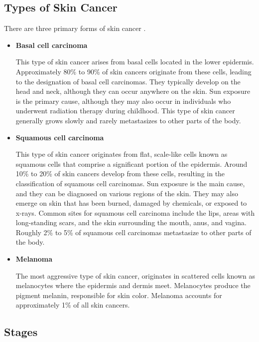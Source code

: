\subsection{Types of Skin Cancer}

There are three primary forms of skin cancer \cite{BaseCancerKnowledge}.

\begin{itemize}

  \item \textbf{Basal cell carcinoma}

    This type of skin cancer arises from basal cells located in the lower
    epidermis. Approximately 80\% to 90\% of skin cancers originate from
    these cells, leading to the designation of basal cell carcinomas. They
    typically develop on the head and neck, although they can occur anywhere
    on the skin. Sun exposure is the primary cause, although they may also
    occur in individuals who underwent radiation therapy during childhood.
    This type of skin cancer generally grows slowly and rarely metastasizes
    to other parts of the body.

  \item \textbf{Squamous cell carcinoma}

    This type of skin cancer originates from flat, scale-like cells known as
    squamous cells that comprise a significant portion of the epidermis.
    Around 10\% to 20\% of skin cancers develop from these cells, resulting
    in the classification of squamous cell carcinomas. Sun exposure is the
    main cause, and they can be diagnosed on various regions of the skin.
    They may also emerge on skin that has been burned, damaged by chemicals,
    or exposed to x-rays. Common sites for squamous cell carcinoma include
    the lips, areas with long-standing scars, and the skin surrounding the
    mouth, anus, and vagina. Roughly 2\% to 5\% of squamous cell carcinomas
    metastasize to other parts of the body.

  \item \textbf{Melanoma}

    The most aggressive type of skin cancer, originates in scattered cells
    known as melanocytes where the epidermis and dermis meet. Melanocytes
    produce the pigment melanin, responsible for skin color. Melanoma
    accounts for approximately 1\% of all skin cancers.

\end{itemize}

\subsection{Stages}

